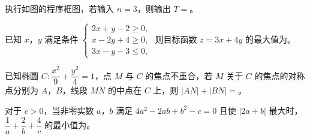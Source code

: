 \Needspace{0.4\textheight}
\begin{question}
执行如图的程序框图，若输入 $n=3$，则输出 $T=$\gkblank{}。
\nopagebreak[4]
\begin{center}\end{center}
\nopagebreak[4]
\end{question}
\begin{question}
已知 $x$，$y$ 满足条件 $\begin{cases}2x+y-2\geqslant 0,\\x-2y+4\geqslant 0,\\3x-y-3\leqslant 0,\end{cases}$ 则目标函数 $z=3x+4y$ 的最大值为\gkblank{}。

\end{question}
\begin{question}
已知椭圆 $C:\dfrac{x^2}9+\dfrac{y^2}4=1$，点 $M$ 与 $C$ 的焦点不重合，若 $M$ 关于 $C$ 的焦点的对称点分别为 $A$，$B$，线段 $MN$ 的中点在 $C$ 上，则 $|AN|+|BN|=$\gkblank{}。

\end{question}
\begin{question}
对于 $c>0$，当非零实数 $a$，$b$ 满足 $4a^2-2ab+b^2-c=0$ 且使 $|2a+b|$ 最大时，$\dfrac1a+\dfrac2b+\dfrac4c$ 的最小值为\gkblank{}。

\end{question}

